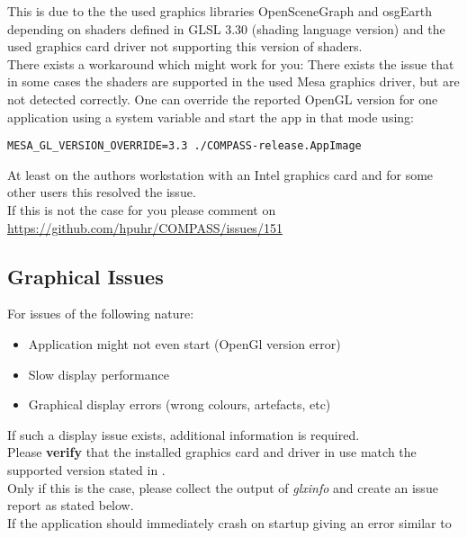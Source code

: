 This is due to the the used graphics libraries OpenSceneGraph and osgEarth depending on shaders defined in GLSL 3.30 (shading language version) and the used graphics card driver not supporting this version of shaders. \\

There exists a workaround which might work for you: There exists the issue that in some cases the shaders are supported in the used Mesa graphics driver, but are not detected correctly. One can override the reported OpenGL version for one application using a system variable and start the app in that mode using:

\begin{lstlisting}
MESA_GL_VERSION_OVERRIDE=3.3 ./COMPASS-release.AppImage
\end{lstlisting}

At least on the authors workstation with an Intel graphics card and for some other users this resolved the issue. \\

If this is not the case for you please comment on \url{https://github.com/hpuhr/COMPASS/issues/151}

\subsection{Graphical Issues}

For issues of the following nature:

\begin{itemize} 
\item Application might not even start (OpenGl version error)
\item Slow display performance
\item Graphical display errors (wrong colours, artefacts, etc) 
\end{itemize} 

If such a display issue exists, additional information is required. \\

Please \textbf{verify} that the installed graphics card and driver in use match the supported version stated in . \\

Only if this is the case, please collect the output of \textit{glxinfo} and create an issue report as stated below. \\

If the application should immediately crash on startup giving an error similar to

